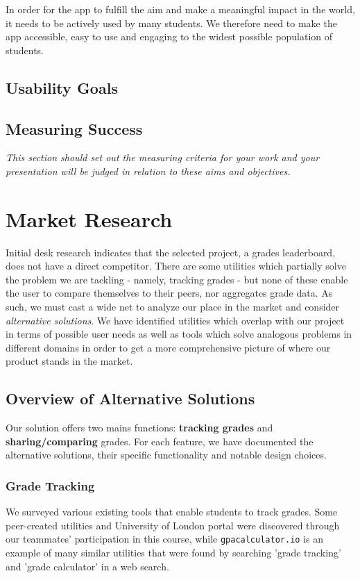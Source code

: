 In order for the app to fulfill the aim and make a meaningful impact in the world, it needs to be actively used by many students. We therefore need to make the app accessible, easy to use and engaging to the widest possible population of students.

\subsection{Usability Goals}

\subsection{Measuring Success}
\textit{This section should set out the measuring criteria for your work and your presentation will be judged in relation to these aims and objectives.}

\section{Market Research}
Initial desk research indicates that the selected project, a grades leaderboard, does not have a direct competitor. There are some utilities which partially solve the problem we are tackling - namely, tracking grades - but none of these enable the user to compare themselves to their peers, nor aggregates grade data. As such, we must cast a wide net to analyze our place in the market and consider \emph{alternative solutions}. We have identified utilities which overlap with our project in terms of possible user needs as well as tools which solve analogous problems in different domains in order to get a more comprehensive picture of where our product stands in the market.
\subsection{Overview of Alternative Solutions}
Our solution offers two mains functions: \textbf{tracking grades} and \textbf{sharing/comparing} grades. For each feature, we have documented the alternative solutions, their specific functionality and notable design choices.
\subsubsection{Grade Tracking}
We surveyed various existing tools that enable students to track grades. Some peer-created utilities and University of London portal were discovered through our teammates' participation in this course, while \texttt{gpacalculator.io} \cite{gpa_calculator} is an example of many similar utilities that were found by searching 'grade tracking' and 'grade calculator' in a web search.

